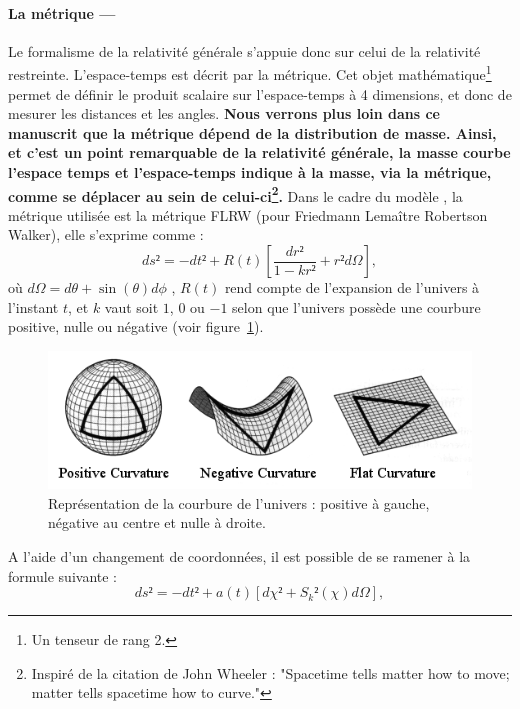 \documentclass[11pt, twoside, a4paper, openright]{report}
\begin{document}
\paragraph{La métrique —}
Le formalisme de la relativité générale s'appuie donc sur celui de la relativité restreinte. L'espace-temps est décrit par la métrique. Cet objet mathématique\footnote{Un tenseur de rang 2.} permet de définir le produit scalaire sur l'espace-temps à 4 dimensions, et donc de mesurer les distances et les angles.
\textbf{Nous verrons plus loin dans ce manuscrit que la métrique dépend de la distribution de masse. Ainsi, et c'est un point remarquable de la relativité générale, la masse courbe l'espace temps et l'espace-temps indique à la masse, via la métrique, comme se déplacer au sein de celui-ci\footnote{Inspiré de la citation de John Wheeler : "Spacetime tells matter how to move; matter tells spacetime how to curve."}.}
Dans le cadre du modèle \lcdm{}, la métrique utilisée est la métrique FLRW (pour Friedmann Lemaître Robertson Walker), elle s'exprime comme :
\begin{equation}
  \label{eq:metrique1}
  ds² = - dt² + R(t) \left[ \frac{dr²}{1 - k r²} + r² d\Omega \right],
\end{equation}
où $d\Omega = d\theta + \sin(\theta) d\phi$ , $R(t)$ rend compte de l'expansion de l'univers à l'instant $t$, et $k$ vaut soit $1$, $0$ ou $-1$ selon que l'univers possède une courbure positive, nulle ou négative (voir figure~\ref{fig:curvature}).
\begin{figure}
  \centering
  \includegraphics[scale=0.6]{curvature}
  \caption{Représentation de la courbure de l'univers : positive à gauche, négative au centre et nulle à droite.}
  \label{fig:curvature}
\end{figure}
A l'aide d'un changement de coordonnées, il est possible de se ramener à la formule suivante :
\begin{equation}
  \label{eq:metrique2}
  ds² = - dt² + a(t)\left[ d\chi² + S_{k}²(\chi) d\Omega \right],
\end{equation}
\end{document}
